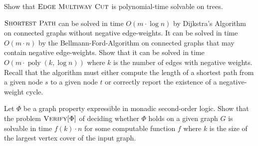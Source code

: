 \begin{exercise}
Show that $\textsc{Edge Multiway Cut}$ is polynomial-time solvable on trees.
\end{exercise}

\begin{exercise}[\easy]
$\textsc{Shortest Path}$ can be solved in time $O(m\cdot \log n)$ by Dijkstra's Algorithm on connected graphs without negative edge-weights. It can be solved in time $O(m \cdot n)$ by the Bellmann-Ford-Algorithm on connected graphs that may contain negative edge-weights. Show that it can be solved in time $O(m\cdot \operatorname{poly}(k,\log n))$ where $k$ is the number of edges with negative weights. Recall that the algorithm must either compute the length of a shortest path from a given node $s$ to a given node $t$ or correctly report the existence of a negative-weight cycle.
\end{exercise}

\begin{exercise}[\easy]
Let $\Phi$ be a graph property expressible in monadic second-order logic. Show that the problem $\textsc{Verify}[\Phi]$ of deciding whether $\Phi$ holds on a given graph $G$ is solvable in time $f(k)\cdot n$ for some computable function $f$ where $k$ is the size of the largest vertex cover of the input graph.
\end{exercise}

